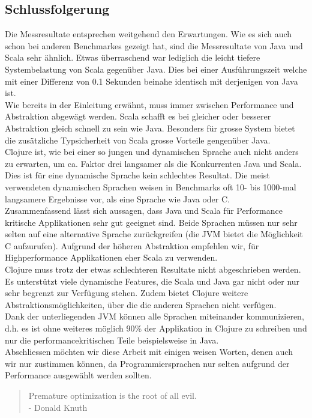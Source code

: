 \documentclass{fancydocument}
\begin{document}
\subsection{Schlussfolgerung}
Die Messresultate entsprechen weitgehend den Erwartungen. Wie es sich
auch schon bei anderen Benchmarkes gezeigt hat, sind die Messresultate
von Java und Scala sehr ähnlich. Etwas überraschend war lediglich die
leicht tiefere Systembelastung von Scala gegenüber Java. Dies bei
einer Ausführungszeit welche mit einer Differenz von 0.1 Sekunden
beinahe identisch mit derjenigen von Java ist. 
\\
Wie bereits in der Einleitung erwähnt, muss immer zwischen 
Performance und Abstraktion abgewägt werden. Scala schafft es bei gleicher oder
besserer Abstraktion gleich schnell zu sein wie Java. Besonders f\"ur
grosse System bietet die zus\"atzliche Typsicherheit von Scala grosse
Vorteile gengen\"uber Java.
\\
Clojure ist, wie bei einer so jungen und dynamischen Sprache auch nicht anders zu
erwarten, um ca. Faktor drei langsamer als die Konkurrenten Java und Scala.
Dies ist f\"ur eine dynamische Sprache kein schlechtes Resultat. Die meist
verwendeten dynamischen Sprachen weisen in Benchmarks oft 10- bis 1000-mal langsamere
Ergebnisse vor, als eine Sprache wie Java oder C.
\\
Zusammenfassend lässt sich aussagen, dass Java und Scala
f\"ur Performance kritische Applikationen sehr gut geeignet
sind. Beide Sprachen müssen nur sehr selten auf eine alternative
Sprache zurückgreifen (die JVM bietet die Möglichkeit C
aufzurufen). Aufgrund der h\"oheren Abstraktion empfehlen wir,
f\"ur Highperformance Applikationen eher Scala zu verwenden.
\\
Clojure muss trotz der etwas schlechteren Resultate nicht abgeschrieben werden. Es unterstützt viele dynamische Features, die Scala
und Java gar nicht oder nur sehr begrenzt zur Verfügung stehen. Zudem 
bietet Clojure weitere Abstraktionsmöglichkeiten, über die die anderen Sprachen nicht verfügen.
\\
Dank der unterliegenden JVM k\"onnen alle Sprachen miteinander kommunizieren, d.h. es ist ohne weiteres möglich 90\% der Applikation in
Clojure zu schreiben und nur die performancekritischen Teile beispielsweise in Java.
\\
Abschliessen m\"ochten wir diese Arbeit mit einigen weisen Worten, denen auch wir nur zustimmen können, da Programmiersprachen nur selten aufgrund der Performance ausgew\"ahlt werden sollten.
\begin{quote}
Premature optimization is the root of all evil.\\
- Donald Knuth
\end{quote}
\end{document}
